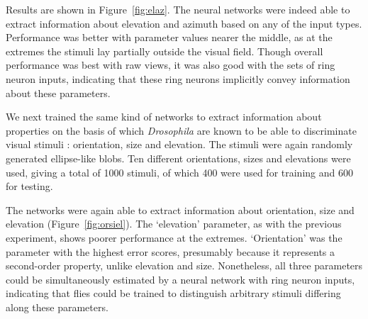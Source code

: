 Results are shown in Figure~\ref{fig:elaz}.
The neural networks were indeed able to extract information about elevation and azimuth based on any of the input types.
Performance was better with parameter values nearer the middle, as at the extremes the stimuli lay partially outside the visual field.
Though overall performance was best with raw views, it was also good with the sets of ring neuron inputs, indicating that these ring neurons implicitly convey information about these parameters.

We next trained the same kind of networks to extract information about properties on the basis of which \emph{Drosophila} are known to be able to discriminate visual stimuli \cite{Pan2009}: orientation, size and elevation.
The stimuli were again randomly generated ellipse-like blobs.
Ten different orientations, sizes and elevations were used, giving a total of 1000 stimuli, of which 400 were used for training and 600 for testing.

The networks were again able to extract information about orientation, size and elevation (Figure~\ref{fig:orsiel}).
The `elevation' parameter, as with the previous experiment, shows poorer performance at the extremes.
`Orientation' was the parameter with the highest error scores, presumably because it represents a second-order property, unlike elevation and size.
Nonetheless, all three parameters could be simultaneously estimated by a neural network with ring neuron inputs, indicating that flies could be trained to distinguish arbitrary stimuli differing along these parameters.